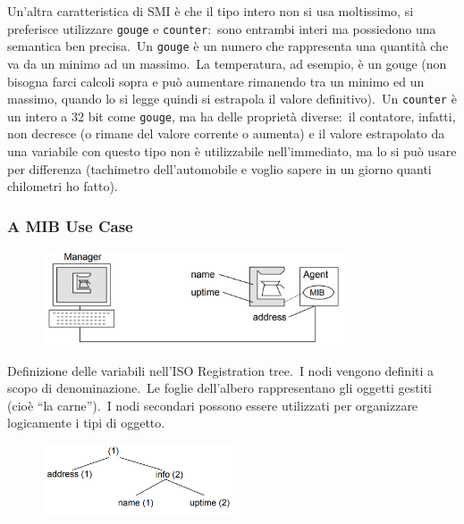 \noindent Un'altra caratteristica di SMI è che il tipo intero non si usa moltissimo, si preferisce utilizzare \texttt{gouge} e \texttt{counter}:\ sono entrambi interi ma possiedono una semantica ben precisa.\
Un \texttt{gouge} è un numero che rappresenta una quantità che va da un minimo ad un massimo.\
La temperatura, ad esempio, è un gouge (non bisogna farci calcoli sopra e può aumentare rimanendo tra un minimo ed un massimo, quando lo si legge quindi si estrapola il valore definitivo).\
Un \texttt{counter} è un intero a 32 bit come \texttt{gouge}, ma ha delle proprietà diverse:\ il contatore, infatti, non decresce (o rimane del valore corrente o aumenta) e il valore estrapolato da una variabile con questo tipo non è utilizzabile nell'immediato, ma lo si può usare per differenza (tachimetro dell'automobile e voglio sapere in un giorno quanti chilometri ho fatto).

\subsubsection{A MIB Use Case}

\begin{figure}[H]
    \centering
    \includegraphics[width=0.8\textwidth]{immagini/MIB_useCase.png}
\end{figure}

Definizione delle variabili nell'ISO Registration tree.\
I nodi vengono definiti a scopo di denominazione.\
Le foglie dell'albero rappresentano gli oggetti gestiti (cioè ``la carne'').\
I nodi secondari possono essere utilizzati per organizzare logicamente i tipi di oggetto.\

\begin{figure}[H]
    \centering
    \includegraphics[width=0.5\textwidth]{immagini/ISO_registration_tree.png}
\end{figure}

